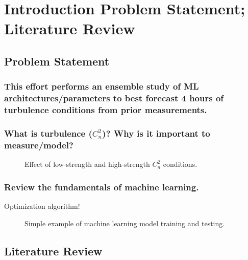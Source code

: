 \chapter{Introduction Problem Statement; Literature Review}
\label{ch1}

\section{Problem Statement}
\subsection{This effort performs an ensemble study of ML architectures/parameters to best forecast 4 hours of turbulence conditions from prior measurements.}

\subsection{What is turbulence ($C_{n}^{2}$)? Why is it important to measure/model?}
\begin{figure}[h!]
	\centering
	\hfill
	\caption{Effect of low-strength and high-strength $C_{n}^{2}$ conditions.}
	\label{fig:first_frames}
\end{figure}

\subsection{Review the fundamentals of machine learning.}
Optimization algorithm!
\begin{figure}[h!]
	\centering
	\hfill
	\hfill
	\caption{Simple example of machine learning model training and testing.}
	\label{fig:simple_model_training_testing}
\end{figure}

\section{Literature Review}
